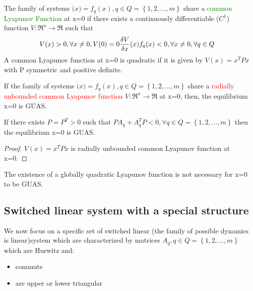 \begin{defn}
	The family of systems $\dot(x)=f_q(x), q\in Q=\left\{1,2,\dots,m\right\}$ share a \textcolor{green}{common Lyapunov Function} at x=0 if there exists a continuously differentiable ($C^1$) function $V\colon\Re^n\to\Re$ such that \[
	 V(x)>0, \forall x \neq0, V(0)=0\\ \frac{\delta V}{\delta x}(x)f_q(x)<0, \forall x \neq0, \forall q \in Q
	 \]
	 A common Lyapunov function at x=0 is quadratic if it is given by $V(x)=x^TPx$ with P symmetric and positive definite.
\end{defn}
\begin{thm}\label{lyap-th}
	If the family of systems $\dot(x)=f_q(x), q\in Q=\left\{1,2,\dots,m\right\}$ share a \textcolor{red}{radially unbounded common Lyapunov function} $V\colon\Re^n\to\Re$ at x=0, then, the equilibrium x=0 is GUAS.
\end{thm}
\begin{thm} \label{quad-lyap-th}
	If there exists $P=P^T>0$ such that $PA_q+A_q^TP<0, \forall q \in Q= \left\{1,2,\dots,m\right\}$ then the equilibrium x=0 is GUAS.
\end{thm}
\begin{proof}
	$V(x)=x^TPx$ is radially unbounded common Lyapunov function at x=0.
\end{proof}
\begin{remark}
	The existence of a globally quadratic Lyapunov function is not necessary for x=0 to be GUAS.
\end{remark}

\subsection{Switched linear system with a special structure}
We now focus on a specific set of switched linear (the family of possible dynamics is linear)system which are characterized by matrices $A_q,q\in Q=\left\{1,2,\dots,m\right\}$ which are Hurwitz and:
\begin{itemize}
	\item commute
	\item are upper or lower triangular
\end{itemize}

